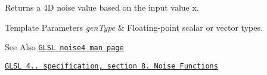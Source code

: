 Returns a 4\-D noise value based on the input value x. 


\begin{DoxyTemplParams}{Template Parameters}
{\em gen\-Type} & Floating-\/point scalar or vector types.\\
\hline
\end{DoxyTemplParams}
\begin{DoxySeeAlso}{See Also}
\href{http://www.opengl.org/sdk/docs/manglsl/xhtml/noise4.xml}{\tt G\-L\-S\-L noise4 man page} 

\href{http://www.opengl.org/registry/doc/GLSLangSpec.4.20.8.pdf}{\tt G\-L\-S\-L 4.. specification, section 8. Noise Functions} 
\end{DoxySeeAlso}
